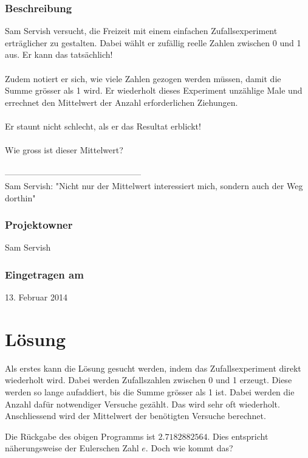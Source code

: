 \documentclass[a4paper, 10pt, fleqn]{article}
\begin{document}
\subsubsection*{Beschreibung}
Sam Servish versucht, die Freizeit mit einem einfachen Zufallsexperiment 
erträglicher zu gestalten. Dabei wählt er zufällig reelle Zahlen zwischen 0 
und 1 aus. Er kann das tatsächlich!
\\\\
Zudem notiert er sich, wie viele Zahlen gezogen werden müssen, damit die Summe 
grösser als 1 wird. Er wiederholt dieses Experiment unzählige Male und 
errechnet den Mittelwert der Anzahl erforderlichen Ziehungen.
\\\\
Er staunt nicht schlecht, als er das Resultat erblickt!
\\\\
Wie gross ist dieser Mittelwert?
\\\\
------------------------------------------------\\
Sam Servish: "Nicht nur der Mittelwert interessiert mich, sondern auch der Weg 
dorthin"

\subsubsection*{Projektowner}
Sam Servish 

\subsubsection*{Eingetragen am}
13. Februar 2014 \\

\newpage

\section{Lösung}
Als erstes kann die Lösung gesucht werden, indem das Zufallsexperiment direkt 
wiederholt wird. Dabei werden Zufallszahlen zwischen 0 und 1 erzeugt. Diese 
werden so lange aufaddiert, bis die Summe grösser als 1 ist. Dabei werden die 
Anzahl dafür notwendiger Versuche gezählt. Das wird sehr oft wiederholt. 
Anschliessend wird der Mittelwert der benötigten Versuche berechnet. 

Die Rückgabe des obigen Programms ist $2.7182882564$. Dies entspricht 
näherungsweise der Eulerschen Zahl $e$. Doch wie kommt das? 

\newpage
\end{document}
